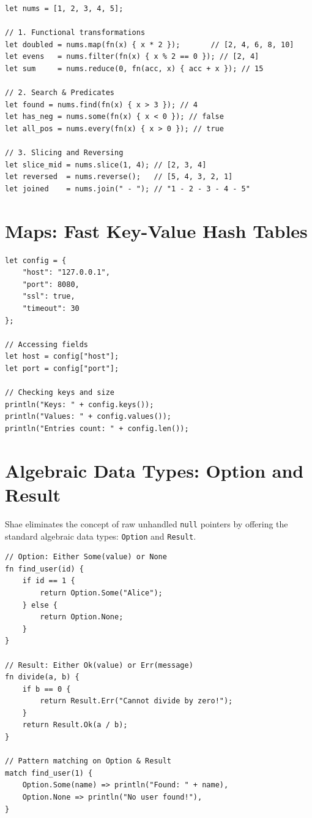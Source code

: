 \begin{lstlisting}[language=shaelang]
let nums = [1, 2, 3, 4, 5];

// 1. Functional transformations
let doubled = nums.map(fn(x) { x * 2 });       // [2, 4, 6, 8, 10]
let evens   = nums.filter(fn(x) { x % 2 == 0 }); // [2, 4]
let sum     = nums.reduce(0, fn(acc, x) { acc + x }); // 15

// 2. Search & Predicates
let found = nums.find(fn(x) { x > 3 }); // 4
let has_neg = nums.some(fn(x) { x < 0 }); // false
let all_pos = nums.every(fn(x) { x > 0 }); // true

// 3. Slicing and Reversing
let slice_mid = nums.slice(1, 4); // [2, 3, 4]
let reversed  = nums.reverse();   // [5, 4, 3, 2, 1]
let joined    = nums.join(" - "); // "1 - 2 - 3 - 4 - 5"
\end{lstlisting}

\section{Maps: Fast Key-Value Hash Tables}

\begin{lstlisting}[language=shaelang]
let config = {
    "host": "127.0.0.1",
    "port": 8080,
    "ssl": true,
    "timeout": 30
};

// Accessing fields
let host = config["host"];
let port = config["port"];

// Checking keys and size
println("Keys: " + config.keys());
println("Values: " + config.values());
println("Entries count: " + config.len());
\end{lstlisting}

\section{Algebraic Data Types: Option and Result}

Shae eliminates the concept of raw unhandled \texttt{null} pointers by offering the standard algebraic data types: \texttt{Option} and \texttt{Result}.

\begin{lstlisting}[language=shaelang]
// Option: Either Some(value) or None
fn find_user(id) {
    if id == 1 {
        return Option.Some("Alice");
    } else {
        return Option.None;
    }
}

// Result: Either Ok(value) or Err(message)
fn divide(a, b) {
    if b == 0 {
        return Result.Err("Cannot divide by zero!");
    }
    return Result.Ok(a / b);
}

// Pattern matching on Option & Result
match find_user(1) {
    Option.Some(name) => println("Found: " + name),
    Option.None => println("No user found!"),
}
\end{lstlisting}
